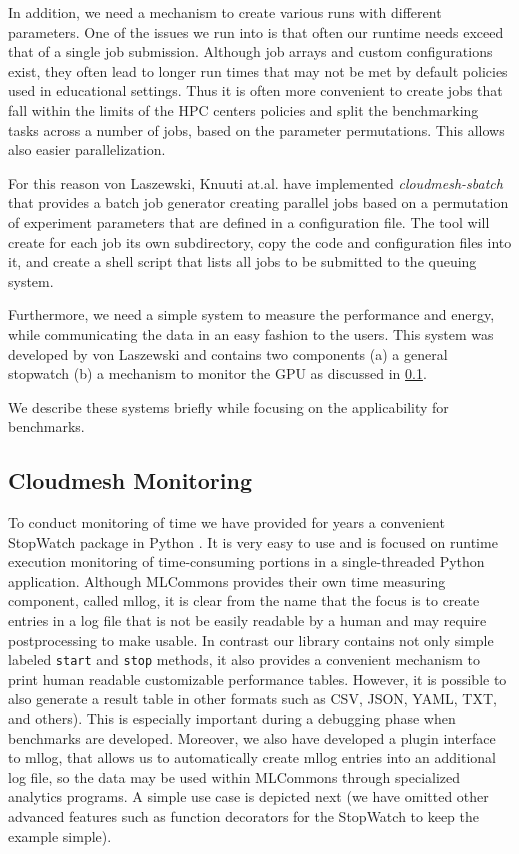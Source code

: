 \documentclass[utf8]{FrontiersinVancouver} %
\begin{document}
In addition, we need a mechanism to create various runs with different
parameters. One of the issues we run into is that often our runtime
needs exceed that of a single job submission. Although job arrays and
custom configurations exist, they often lead to longer run times that
may not be met by default policies used in educational settings. Thus
it is often more convenient to create jobs that fall within the limits
of the HPC centers policies and split the benchmarking tasks across a
number of jobs, based on the parameter permutations. This allows also
easier parallelization.

For this reason von Laszewski, Knuuti at.al. have implemented {\it
  cloudmesh-sbatch} that provides a batch job generator creating
parallel jobs based on a permutation of experiment parameters that are
defined in a configuration file. The tool will create for each job its
own subdirectory, copy the code and configuration files into it, and
create a shell script that lists all jobs to be submitted to the
queuing system.

Furthermore, we need a simple system to measure the performance and
energy, while communicating the data in an easy fashion to the
users. This system was developed by von Laszewski and contains two
components (a) a general stopwatch (b) a mechanism to monitor the GPU
as discussed in \ref{sec:monitoring}.

We describe these systems briefly while focusing on the applicability
for benchmarks.

\subsection{Cloudmesh Monitoring}
\label{sec:monitoring}

To conduct monitoring of time we have provided for years a convenient
StopWatch package in Python \citep{cloudmesh-stopwatch}.  It is very
easy to use and is focused on runtime execution monitoring of
time-consuming portions in a single-threaded Python
application. Although MLCommons provides their own time measuring
component, called mllog, it is clear from the name that the focus is
to create entries in a log file that is not be easily readable by a
human and may require postprocessing to make usable. In contrast our
library contains not only simple labeled \verb|start| and \verb|stop|
methods, it also provides a convenient mechanism to print human
readable customizable performance tables. However, it is possible to
also generate a result table in other formats such as CSV, JSON, YAML,
TXT, and others).  This is especially important during a debugging
phase when benchmarks are developed. Moreover, we also have developed
a plugin interface to mllog, that allows us to automatically create
mllog entries into an additional log file, so the data may be used
within MLCommons through specialized analytics programs. A simple use
case is depicted next (we have omitted other advanced features such as
function decorators for the StopWatch to keep the example simple).
\end{document}
